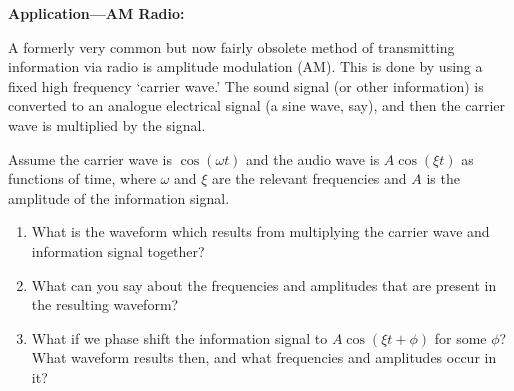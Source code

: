 \documentclass{article}
\begin{document}
\clearpage



\textbf{Application---AM Radio:}

\vspace{5mm}

A formerly very common but now fairly obsolete method of transmitting information via radio is amplitude modulation (AM). This is done by using a fixed high frequency `carrier wave.' The sound signal (or other information) is converted to an analogue electrical signal (a sine wave, say), and then the carrier wave is multiplied by the signal.

Assume the carrier wave is $\cos(\omega t)$ and the audio wave is $A\cos(\xi t)$ as functions of time, where $\omega$ and $\xi$ are the relevant frequencies and $A$ is the amplitude of the information signal.

\begin{enumerate}
\item What is the waveform which results from multiplying the carrier wave and information signal together?
\item What can you say about the frequencies and amplitudes that are present in the resulting waveform?
\item What if we phase shift the information signal to $A\cos(\xi t+\phi)$ for some $\phi$? What waveform results then, and what frequencies and amplitudes occur in it?
\end{enumerate}

\begin{center}
\end{center}
\end{document}
